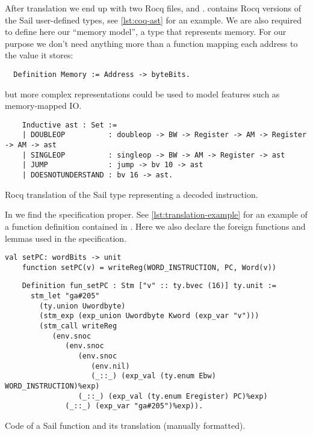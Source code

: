 After translation we end up with two Rocq files,  and .  contains Rocq versions of the Sail user-defined types, see \cref{lst:coq-ast} for an example. We are also required to define here our ``memory model'', \ie a type that represents memory. For our purpose we don't need anything more than a function mapping each address to the value it stores:
\begin{verbatim}
  Definition Memory := Address -> byteBits.
\end{verbatim}
but more complex representations could be used to model features such as memory-mapped IO.

\begin{listing}
  \begin{verbatim}
    Inductive ast : Set :=
    | DOUBLEOP          : doubleop -> BW -> Register -> AM -> Register -> AM -> ast
    | SINGLEOP          : singleop -> BW -> AM -> Register -> ast
    | JUMP              : jump -> bv 10 -> ast
    | DOESNOTUNDERSTAND : bv 16 -> ast.
  \end{verbatim}
  \caption{Rocq translation of the Sail type representing a decoded instruction.}
  \label{lst:coq-ast}
\end{listing}

In  we find the \usail specification proper. See \cref{lst:translation-example} for an example of a \usail function definition contained in . Here we also declare the foreign functions and lemmas used in the specification. %

\begin{listing}
  \begin{lstlisting}[language=sail]
    val setPC: wordBits -> unit
    function setPC(v) = writeReg(WORD_INSTRUCTION, PC, Word(v))
  \end{lstlisting}
  \begin{verbatim}
    Definition fun_setPC : Stm ["v" :: ty.bvec (16)] ty.unit :=
      stm_let "ga#205"
        (ty.union Uwordbyte)
        (stm_exp (exp_union Uwordbyte Kword (exp_var "v")))
        (stm_call writeReg
           (env.snoc
              (env.snoc
                 (env.snoc
                    (env.nil)
                    (_::_) (exp_val (ty.enum Ebw) WORD_INSTRUCTION)%exp)
                 (_::_) (exp_val (ty.enum Eregister) PC)%exp)
              (_::_) (exp_var "ga#205")%exp)).
  \end{verbatim}
  \caption{Code of a Sail function and its \usail translation (manually formatted).}
  \label{lst:translation-example}
\end{listing}

